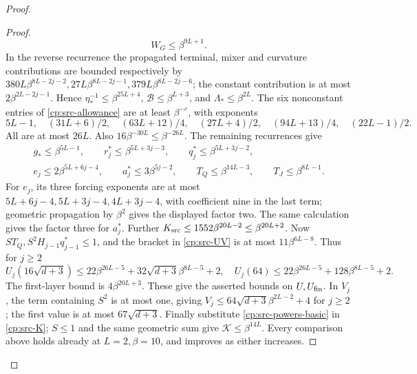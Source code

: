 \begin{proof}
\begin{proof}
\[ W_G\le\beta^{9L+1}.
\]
In the reverse recurrence the propagated terminal, mixer and curvature
contributions are bounded respectively by
\(380L\beta^{8L-2j-2},27L\beta^{8L-2j-1},
379L\beta^{8L-2j-6}\); the constant contribution is at most
\(2\beta^{2L-2j-1}\).  Hence
\(\eta_*^{-1}\le\beta^{25L+4}\),
\(\mathcal B\le\beta^{L+3}\), and \(\Lambda_*\le\beta^{2L}\).
The six nonconstant entries of \eqref{cp:src-allowance} are at least
\(\beta^{-c}\), with exponents
\[
 5L-1,\quad(31L+6)/2,\quad(63L+12)/4,\quad
 (27L+4)/2,\quad(94L+13)/4,\quad(22L-1)/2.
\]
All are at most \(26L\).  Also \(16\beta^{-30L}\le\beta^{-26L}\).
The remaining recurrences give
\begin{gather*}
 g_*\le\beta^{5L-1},\qquad r_j^*\le\beta^{5L+3j-3},\qquad
 q_j^*\le\beta^{5L+3j-2},\\
 e_j\le2\beta^{5L+6j-4},\qquad a_j^*\le3\beta^{5j-2},
 \qquad T_Q\le\beta^{14L-3},\qquad T_J\le\beta^{8L-1}.
\end{gather*}
For \(e_j\), its three forcing exponents are at most
\(5L+6j-4,5L+3j-4,4L+3j-4\), with coefficient nine
in the last term; geometric propagation by \(\beta^2\) gives the
displayed factor two.  The same calculation gives the factor three
for \(a_j^*\).  Further
\(K_{\rm src}\le1552\beta^{20L-2}\le\beta^{20L+2}\).
Now \(ST_Q,S^2H_{j-1}q_{j-1}^*\le1\), and the bracket in
\eqref{cp:src-UV} is at most \(11\beta^{6L-8}\).
Thus for \(j\ge2\)
\[
 U_j(16\sqrt{d+3})\le22\beta^{26L-5}
       +32\sqrt{d+3}\beta^{8L-5}+2,
 \quad U_j(64)\le22\beta^{26L-5}+128\beta^{8L-5}+2.
\]
The first-layer bound is \(4\beta^{20L+3}\).  These give the
asserted bounds on \(U,U_{\rm fin}\).  In \(V_j\), the term
containing \(S^2\) is at most one, giving
\(V_j\le64\sqrt{d+3}\beta^{2L-2}+4\) for \(j\ge2\);
the first value is at most \(67\sqrt{d+3}\).
Finally substitute \eqref{cp:src-powers-basic} in
\eqref{cp:src-K}; \(S\le1\) and the same geometric sum give
\(\mathcal K\le\beta^{14L}\).  Every comparison above holds
already at \(L=2,\beta=10\), and improves as either increases.
\end{proof}


\end{proof}
